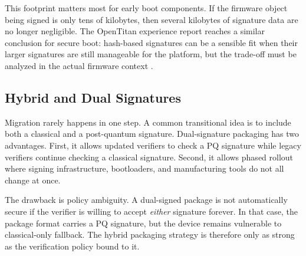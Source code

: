 This footprint matters most for early boot components. If the firmware object being signed is only tens of kilobytes, then several kilobytes of signature data are no longer negligible. The OpenTitan experience report reaches a similar conclusion for secure boot: hash-based signatures can be a sensible fit when their larger signatures are still manageable for the platform, but the trade-off must be analyzed in the actual firmware context \cite{zerorisc_opentitan}.

\subsection{Hybrid and Dual Signatures}

Migration rarely happens in one step. A common transitional idea is to include both a classical and a post-quantum signature. Dual-signature packaging has two advantages. First, it allows updated verifiers to check a PQ signature while legacy verifiers continue checking a classical signature. Second, it allows phased rollout where signing infrastructure, bootloaders, and manufacturing tools do not all change at once.

The drawback is policy ambiguity. A dual-signed package is not automatically secure if the verifier is willing to accept \textit{either} signature forever. In that case, the package format carries a PQ signature, but the device remains vulnerable to classical-only fallback. The hybrid packaging strategy is therefore only as strong as the verification policy bound to it.


